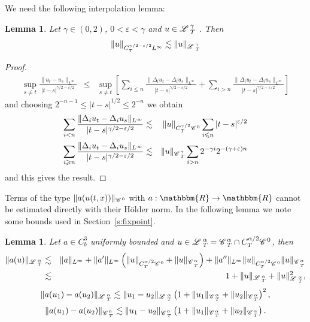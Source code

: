 \documentclass[11pt,reqno]{amsart}
\newtheorem{lemma}[theorem]{Lemma}
\newcommand{\CC}{\mathscr{C} \hspace{.1em}}
\newcommand{\LL}{\mathscr{L} \hspace{.2em}}
\begin{document}
We need the following interpolation lemma:

\begin{lemma}
  \label{l:interpol} Let $\gamma \in (0, 2)$, $0 < \varepsilon < \gamma$ and
  $u \in \LL^{\gamma}_T$ . Then
  \[ \| u \|_{C_T^{\gamma / 2 - \varepsilon / 2} L^{\infty}} \lesssim \| u
     \|_{\LL^{\gamma}_T} \]
\end{lemma}

\begin{proof}
  
  \begin{eqnarray*}
    \sup_{s \neq t} \frac{\| u_t - u_s \|_{L^{\infty}}}{| t - s |^{\gamma / 2
    - \varepsilon / 2}} & \leqslant & \sup_{s \neq t} \left[ \sum_{i \leqslant
    n} \frac{\| \Delta_i u_t - \Delta_i u_s \|_{L^{\infty}}}{| t - s |^{\gamma
    / 2 - \varepsilon / 2}} + \sum_{i > n} \frac{\| \Delta_i u_t - \Delta_i
    u_s \|_{L^{\infty}}}{| t - s |^{\gamma / 2 - \varepsilon / 2}} \right]
  \end{eqnarray*}
  and choosing $2^{- n - 1} \leqslant | t - s |^{1 / 2} \leqslant 2^{- n}$ we
  obtain
  \begin{eqnarray*}
    \sum_{i < n} \frac{\| \Delta_i u_t - \Delta_i u_s \|_{L^{\infty}}}{| t - s
    |^{\gamma / 2 - \varepsilon / 2}} & \lesssim & \| u \|_{C_T^{\gamma / 2}
    \CC^0} \sum_{i \leqslant n} | t - s |^{\varepsilon / 2}\\
    \sum_{i \geqslant n} \frac{\| \Delta_i u_t - \Delta_i u_s
    \|_{L^{\infty}}}{| t - s |^{\gamma / 2 - \varepsilon / 2}} & \lesssim & \|
    u \|_{\CC^{\gamma}_T} \sum_{i > n} 2^{- \gamma i} 2^{- (\gamma +
    \varepsilon) n}
  \end{eqnarray*}
  and this gives the result.
\end{proof}

Terms of the type $\| a (u (t, x)) \|_{\CC^0}$ with $a : \mathbbm{R}
\rightarrow \mathbbm{R}$ cannot be estimated directly with their H{\"o}lder
norm. In the following lemma we note some bounds used in
Section~\ref{s:fixpoint}.

\begin{lemma}
  Let $a \in C^3_b$ uniformly bounded and $u \in \LL^{\alpha}_T =
  \CC^{\alpha}_T \cap C_T^{\alpha / 2} \CC^0$, then
  \begin{eqnarray*}
    \| a (u) \|_{\LL^{\alpha}_T} & \lesssim & \| a \|_{L^{\infty}} + \| a'
    \|_{L^{\infty}} \left( \| u \|_{C_T^{\alpha / 2} \CC^0} + \| u
    \|_{\CC^{\alpha}_{_T}} \right) + \| a'' \|_{L^{\infty}} \| u
    \|_{C_T^{\alpha / 2} \CC^0} \| u \|_{\CC^{\alpha}_{_T}}\\
    & \lesssim & 1 + \| u \|_{\LL^{\alpha}_T} + \| u \|^2_{\LL_T^{\alpha}},
  \end{eqnarray*}
  \[ \| a (u_1) - a (u_2) \|_{\LL_T^{\alpha}} \lesssim \| u_1 - u_2
     \|_{\LL^{\alpha}_T} \left( 1 + \| u_1 \|_{\CC^{\alpha}_T} + \| u_2
     \|_{\CC^{\alpha}_T} \right)^2, \]
  \[ \| a (u_1) - a (u_2) \|_{\CC_T^0} \lesssim \| u_1 - u_2 \|_{\CC^0_T}
     \left( 1 + \| u_1 \|_{\CC^{\alpha}_T} + \| u_2 \|_{\CC^{\alpha}_T}
     \right) . \]
\end{lemma}
\end{document}
